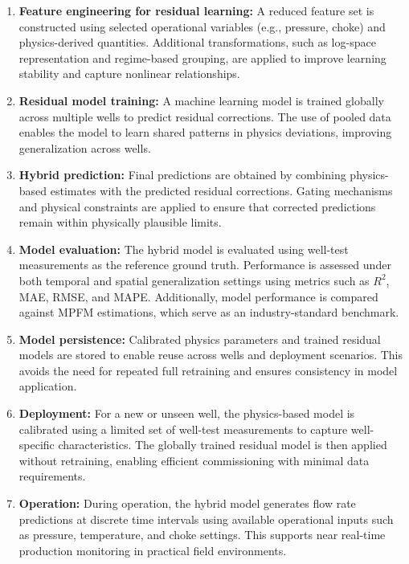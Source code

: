 \documentclass[12pt,APA]{uomthesis}
\begin{document}
\begin{enumerate}
\item \textbf{Feature engineering for residual learning:}  
A reduced feature set is constructed using selected operational variables (e.g., pressure, choke) and physics-derived quantities. Additional transformations, such as log-space representation and regime-based grouping, are applied to improve learning stability and capture nonlinear relationships.

\item \textbf{Residual model training:}  
A machine learning model is trained globally across multiple wells to predict residual corrections. The use of pooled data enables the model to learn shared patterns in physics deviations, improving generalization across wells.

\item \textbf{Hybrid prediction:}  
Final predictions are obtained by combining physics-based estimates with the predicted residual corrections. Gating mechanisms and physical constraints are applied to ensure that corrected predictions remain within physically plausible limits.

\item \textbf{Model evaluation:}  
The hybrid model is evaluated using well-test measurements as the reference ground truth. Performance is assessed under both temporal and spatial generalization settings using metrics such as $R^2$, MAE, RMSE, and MAPE. Additionally, model performance is compared against MPFM estimations, which serve as an industry-standard benchmark.

\item \textbf{Model persistence:}  
Calibrated physics parameters and trained residual models are stored to enable reuse across wells and deployment scenarios. This avoids the need for repeated full retraining and ensures consistency in model application.

\item \textbf{Deployment:}  
For a new or unseen well, the physics-based model is calibrated using a limited set of well-test measurements to capture well-specific characteristics. The globally trained residual model is then applied without retraining, enabling efficient commissioning with minimal data requirements.

\item \textbf{Operation:}  
During operation, the hybrid model generates flow rate predictions at discrete time intervals using available operational inputs such as pressure, temperature, and choke settings. This supports near real-time production monitoring in practical field environments.
\end{enumerate}
\end{document}
